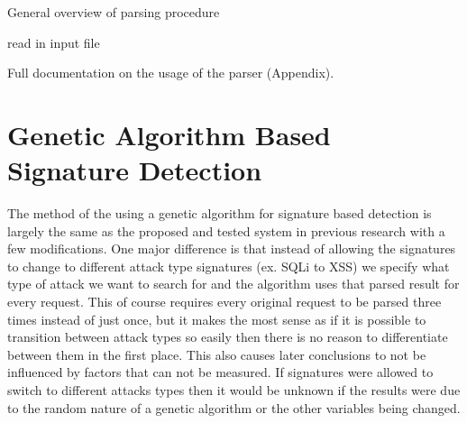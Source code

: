 \begin{algorithm}[H]
	\label{alg:parsing}
	\caption{General overview of parsing procedure}
	
	
	read in input file\;
\end{algorithm}

Full documentation on the usage of the parser (Appendix). %

\section{Genetic Algorithm Based Signature Detection}\label{sec:genIntro}

The method of the using a genetic algorithm for signature based detection is largely the same as the proposed and tested system in previous research with a few modifications. %
One major difference is that instead of allowing the signatures to change to different attack type signatures (ex. SQLi to XSS) we specify what type of attack we want to search for and the algorithm uses that parsed result for every request.  This of course requires every original request to be parsed three times instead of just once, but it makes the most sense as if it is possible to transition between attack types so easily then there is no reason to differentiate between them in the first place.  This also causes later conclusions to not be influenced by factors that can not be measured.  If signatures were allowed to switch to different attacks types then it would be unknown if the results were due to the random nature of a genetic algorithm or the other variables being changed.  

